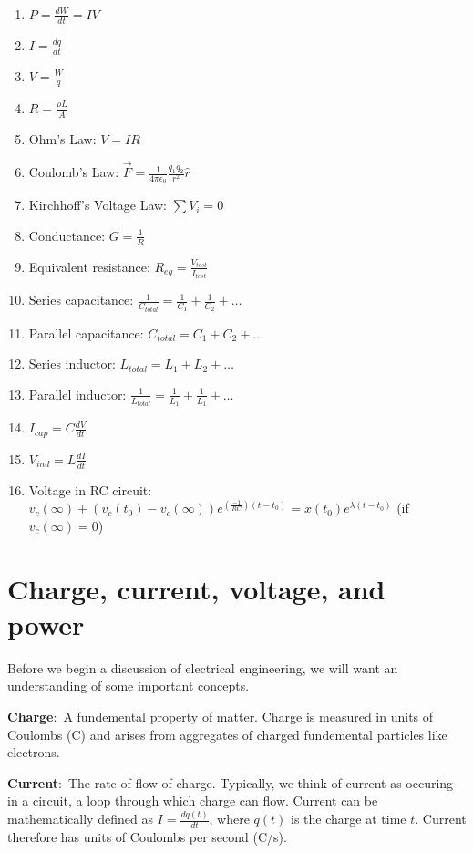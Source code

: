 \documentclass[nobib]{tufte-handout}
\newcommand{\defn}[2]{\noindent\textbf{#1}:\ #2}
\begin{document}
\begin{enumerate}
    \item $P = \frac{dW}{dt} = IV$
    \item $I = \frac{dq}{dt}$
    \item $V = \frac{W}{q}$
    \item $R = \frac{\rho L}{A}$
    \item Ohm's Law: $V=IR$
    \item Coulomb's Law: $\vec{F} = \frac{1}{4\pi \epsilon_0}\frac{q_1 q_2}{r^2}\hat{r}$
    \item Kirchhoff's Voltage Law: $\sum V_i = 0$
    \item Conductance: $G = \frac{1}{R}$
    \item Equivalent resistance: $R_{eq} = \frac{V_{test}}{I_{test}}$
    \item Series capacitance: $\frac{1}{C_{total}} = \frac{1}{C_1} + \frac{1}{C_2} + \dots$
    \item Parallel capacitance: $C_{total} = C_1 + C_2 + \dots$
    \item Series inductor: $L_{total} = L_1+L_2+\dots$
    \item Parallel inductor: $\frac{1}{L_{total}} = \frac{1}{L_1} + \frac{1}{L_1} + \dots$
    \item $I_{cap} = C \frac{dV}{dt}$
    \item $V_{ind} = L \frac{dI}{dt}$
    \item Voltage in RC circuit: 
    $v_c(\infty) +\left(v_c(t_0) - v_c(\infty)\right)e^{(\frac{-1}{RC})(t - t_0)} = x(t_0)e^{\lambda (t-t_0)}$
    (if $v_c(\infty) = 0$)
\end{enumerate}

\pagebreak

\section{Charge, current, voltage, and power}
Before we begin a discussion
of electrical engineering, we will want an
understanding of some important concepts. 

\defn{Charge}{A fundemental property of matter.} Charge
is measured in units of Coulombs (C) and 
arises from aggregates of charged 
fundemental particles like electrons.

\defn{Current}{The rate of flow of charge.} Typically,
we think of current as occuring in a circuit, a loop
through which charge can flow. Current can
be mathematically defined as $I = \frac{dq(t)}{dt}$, where 
$q(t)$ is the charge at time $t$. Current therefore has units
of Coulombs per second (C/s). 
\end{document}
